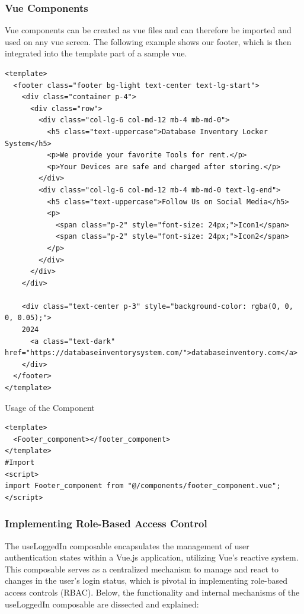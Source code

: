 \subsubsection{Vue Components}
Vue components can be created as vue files and can therefore be imported and used on any vue screen. The following example shows our footer, which is then integrated into the template part of a sample vue.

\begin{lstlisting}
<template>
  <footer class="footer bg-light text-center text-lg-start">
    <div class="container p-4">
      <div class="row">
        <div class="col-lg-6 col-md-12 mb-4 mb-md-0">
          <h5 class="text-uppercase">Database Inventory Locker System</h5>
          <p>We provide your favorite Tools for rent.</p>
          <p>Your Devices are safe and charged after storing.</p>
        </div>
        <div class="col-lg-6 col-md-12 mb-4 mb-md-0 text-lg-end">
          <h5 class="text-uppercase">Follow Us on Social Media</h5>
          <p>
            <span class="p-2" style="font-size: 24px;">Icon1</span>
            <span class="p-2" style="font-size: 24px;">Icon2</span>
          </p>
        </div>
      </div>
    </div>

    <div class="text-center p-3" style="background-color: rgba(0, 0, 0, 0.05);">
    2024
      <a class="text-dark" href="https://databaseinventorysystem.com/">databaseinventory.com</a>
    </div>
  </footer>
</template>

    \end{lstlisting}
Usage of the Component
    \begin{lstlisting}
<template>
  <Footer_component></footer_component>
</template>
#Import 
<script>
import Footer_component from "@/components/footer_component.vue";
</script>
    \end{lstlisting}

\subsubsection{Implementing Role-Based Access Control}
The useLoggedIn composable encapsulates the management of user authentication states within a Vue.js application, utilizing Vue's reactive system. This composable serves as a centralized mechanism to manage and react to changes in the user's login status, which is pivotal in implementing role-based access controls (RBAC). Below, the functionality and internal mechanisms of the useLoggedIn composable are dissected and explained:

